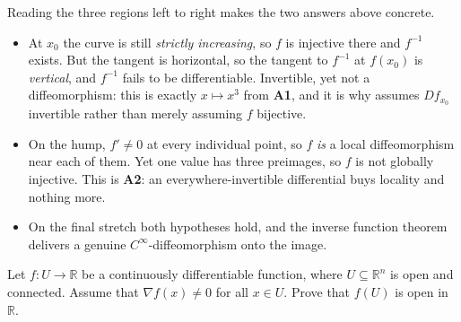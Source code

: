 Reading the three regions left to right makes the two answers above concrete.

\begin{itemize}
  \item At $x_0$ the curve is still \emph{strictly increasing}, so $f$ is injective there and
    $f^{-1}$ exists. But the tangent is horizontal, so the tangent to $f^{-1}$ at $f(x_0)$ is
    \emph{vertical}, and $f^{-1}$ fails to be differentiable. Invertible, yet not a
    diffeomorphism: this is exactly $x \mapsto x^3$ from \textbf{A1}, and it is why
     assumes $Df_{x_0}$ invertible rather than merely
    assuming $f$ bijective.
  \item On the hump, $f' \neq 0$ at every individual point, so $f$ \emph{is} a local
    diffeomorphism near each of them. Yet one value has three preimages, so $f$ is not globally
    injective. This is \textbf{A2}: an everywhere-invertible differential buys locality and
    nothing more.
  \item On the final stretch both hypotheses hold, and the inverse function theorem delivers a
    genuine $C^\infty$-diffeomorphism onto the image.
\end{itemize}




\begin{exercise}
\label{ex:open_mapping_grad_nonzero}
Let $f : U \to \mathbb{R}$ be a continuously differentiable function, where $U \subseteq \mathbb{R}^n$ is open and connected. Assume that $\nabla f(x) \neq 0$ for all $x \in U$. Prove that $f(U)$ is open in $\mathbb{R}$.

\end{exercise}

